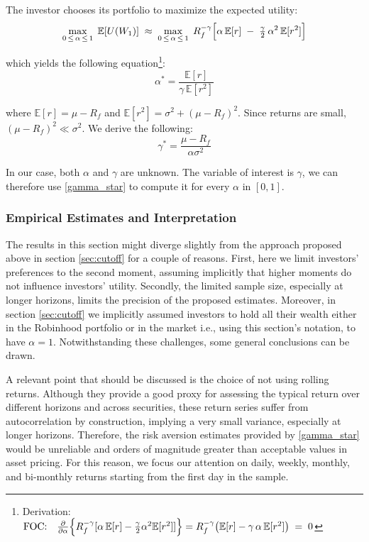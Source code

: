 The investor chooses its portfolio to maximize the expected utility:
\begin{equation}
    \max_{0 \,\le\, \alpha \,\le\, 1}\; \mathbb{E}[U(W_1)]
    \;\approx\;
    \max_{0 \,\le\, \alpha \,\le\, 1}\;
    R_f^{-\gamma}\Bigl[\alpha\,\mathbb{E}[r]\;-\;\tfrac{\gamma}{2}\,\alpha^2\,\mathbb{E}[r^2]\Bigr]
\end{equation}

which yields the following equation\footnote{
    Derivation:
    $\text{FOC:}\quad
    \frac{\partial}{\partial \alpha}\Bigl\{R_f^{-\gamma}[\alpha\,\mathbb{E}[r]-\tfrac{\gamma}{2}\alpha^2\mathbb{E}[r^2]]\Bigr\}
    =
    R_f^{-\gamma}\bigl(\mathbb{E}[r]-\gamma\,\alpha\,\mathbb{E}[r^2]\bigr)
    \;=\;0$}:
\begin{equation}
    \alpha^*=
    \frac{\mathbb{E}[r]}{\gamma\,\mathbb{E}[r^2]}
\end{equation}

where $\mathbb{E}[r]=\mu-R_f$ and $\mathbb{E}[r^2]=\sigma^2+(\mu-R_f)^2$. 
Since returns are small, $(\mu-R_f)^2\ll\sigma^2$. We derive the following:
\begin{equation}
    \gamma^* = \frac{\mu-R_f}{\alpha \sigma^2}
    \label{gamma_star}
\end{equation}

In our case, both $\alpha$ and $\gamma$ are unknown. 
The variable of interest is $\gamma$, we can therefore use \ref{gamma_star} to compute it for every $\alpha$ in $[0,1]$. 


\subsubsection{Empirical Estimates and Interpretation}
\label{sec:gamma_estimates}
The results in this section might diverge slightly from the approach proposed above in section \ref{sec:cutoff} for a couple of reasons. 
First, here we limit investors' preferences to the second moment, assuming implicitly that higher moments do not influence investors' utility.
Secondly, the limited sample size, especially at longer horizons, limits the precision of the proposed estimates.
Moreover, in section \ref{sec:cutoff} we implicitly assumed investors to hold all their wealth either in the Robinhood portfolio or in the market i.e.,
using this section's notation, to have $\alpha=1$.
Notwithstanding these challenges, some general conclusions can be drawn. 

A relevant point that should be discussed is the choice of not using rolling returns. 
Although they provide a good proxy for assessing the typical return over different horizons and across securities, 
these return series suffer from autocorrelation by construction, implying a very small variance, especially at longer horizons.
Therefore, the risk aversion estimates provided by \ref{gamma_star} would be unreliable and orders of magnitude greater than acceptable values in asset pricing.
For this reason, we focus our attention on daily, weekly, monthly, and bi-monthly returns starting from the first day in the sample. 


